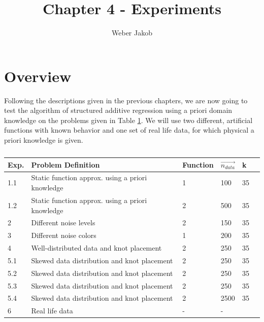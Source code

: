 \documentclass[10pt,a4paper]{article}
\title{Chapter 4 - Experiments}
\author{Weber Jakob}
\begin{document}
	\maketitle
	
\tableofcontents

\section{Overview}


Following the descriptions given in the previous chapters, we are now going to test the algorithm of structured additive regression using a priori domain knowledge on the problems given in Table \ref{tab:experiments}. We will use two different, artificial functions with known behavior and one set of real life data, for which physical a priori knowledge is given. 

\begin{table}[h]
	\begin{tabular}{|l|l|l|l|l|l|}
		\hline
		\textbf{Exp.} & \textbf{Problem Definition} & \textbf{Function} & \textbf{$\vec{n_{data}}$} & \textbf{k}  \\ \hline \toprule
		1.1 & Static function approx. using a priori knowledge & 1 & 100 & 35  \\ \hline
		1.2 & Static function approx. using a priori knowledge & 2 & 500 & 35  \\ \hline
		2   & Different noise levels                                 & 2 & 150 & 35  \\ \hline
		3   & Different noise colors                                 & 1 & 200 & 35  \\ \hline
		4   & Well-distributed data and knot placement               & 2 & 250 & 35  \\ \hline
		5.1 & Skewed data distribution and knot placement            & 2 & 250  & 35  \\ \hline
		5.2 & Skewed data distribution and knot placement            & 2 & 250  & 35  \\ \hline
		5.3 & Skewed data distribution and knot placement            & 2 & 250  & 35  \\ \hline
		5.4 & Skewed data distribution and knot placement            & 2 & 2500 & 35  \\ \hline
		6   & Real life data                                         & - & -   &    \\ \hline \bottomrule
	\end{tabular}
	\caption{}
	\label{tab:experiments}
\end{table}
\end{document}
